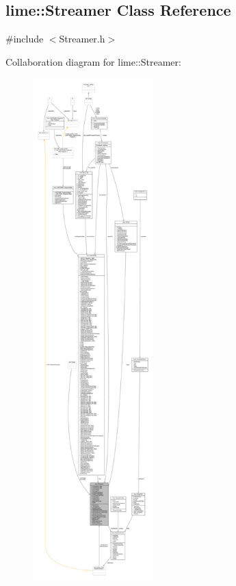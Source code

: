 \subsection{lime\+:\+:Streamer Class Reference}
\label{classlime_1_1Streamer}


{\ttfamily \#include $<$Streamer.\+h$>$}



Collaboration diagram for lime\+:\+:Streamer\+:
\nopagebreak
\begin{figure}[H]
\begin{center}
\leavevmode
\includegraphics[height=550pt]{da/dc1/classlime_1_1Streamer__coll__graph}
\end{center}
\end{figure}
